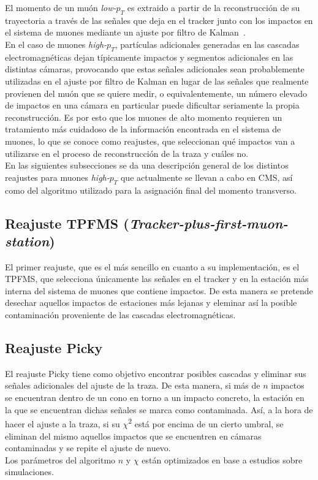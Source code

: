 
El momento de un mu\'on \textit{low-$p_{T}$} es extraido a partir de la reconstrucci\'on de su trayectoria a trav\'es de las se\~nales que deja en el tracker junto con los impactos en el sistema de muones mediante un ajuste por filtro de Kalman~\cite{Kalman1960ANA}. \\

En el caso de muones \textit{high-$p_{T}$}, part\'iculas adicionales generadas en las cascadas electromagn\'eticas dejan t\'ipicamente impactos y segmentos adicionales en las distintas c\'amaras, provocando que estas se\~nales adicionales sean probablemente utilizadas en el ajuste por filtro de Kalman en lugar de las se\~nales que realmente provienen del mu\'on que se quiere medir, o equivalentemente, un n\'umero elevado de impactos en una c\'amara en particular puede dificultar seriamente la propia reconstrucci\'on. Es por esto que los muones de alto momento requieren un tratamiento m\'as cuidadoso de la informaci\'on encontrada en el sistema de muones, lo que se conoce como reajustes, que seleccionan qu\'e impactos van a utilizarse en el proceso de reconstrucci\'on de la traza y cu\'ales no. \\

En las siguientes subsecciones se da una descripci\'on general de los distintos reajustes para muones \textit{high-$p_{T}$} que actualmente se llevan a cabo en CMS, as\'i como del algoritmo utilizado para la asignaci\'on final del momento transverso.

\subsection{Reajuste TPFMS (\textit{Tracker-plus-first-muon-station})}\label{sec:TPFMS}

El primer reajuste, que es el m\'as sencillo en cuanto a su implementaci\'on, es el TPFMS, que selecciona \'unicamente las se\~nales en el tracker y en la estaci\'on m\'as interna del sistema de muones que contiene impactos. De esta manera se pretende desechar aquellos impactos de estaciones m\'as lejanas y eleminar as\'i la posible contaminaci\'on proveniente de las cascadas electromagn\'eticas.

\subsection{Reajuste Picky}\label{sec:Picky}

El reajuste Picky tiene como objetivo encontrar posibles cascadas y eliminar sus se\~nales adicionales del ajuste de la traza. De esta manera, si m\'as de $n$ impactos se encuentran dentro de un cono en torno a un impacto concreto, la estaci\'on en la que se encuentran dichas se\~nales se marca como contaminada. As\'i, a la hora de hacer el ajuste a la traza, si su $\chi$\textsuperscript{2} est\'a por encima de un cierto umbral, se eliminan del mismo aquellos impactos que se encuentren en c\'amaras contaminadas y se repite el ajuste de nuevo. \\
Los par\'ametros del algoritmo $n$ y $\chi$ est\'an optimizados en base a estudios sobre simulaciones.

